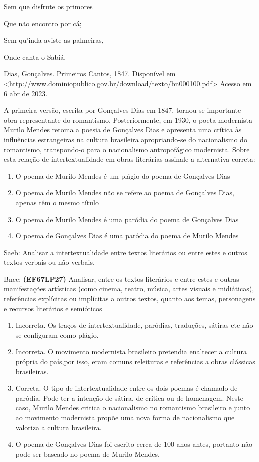 Sem que disfrute os primores

Que não encontro por cá;

Sem qu'inda aviste as palmeiras,

Onde canta o Sabiá.

Dias, Gonçalves. Primeiros Cantos, 1847. Disponível em
\textless{}\href{http://www.dominiopublico.gov.br/download/texto/bn000100.pdf}{\uline{http://www.dominiopublico.gov.br/download/texto/bn000100.pdf}}\textgreater{}
Acesso em 6 abr de 2023.

A primeira versão, escrita por Gonçalves Dias em 1847, tornou-se
importante obra representante do romantismo. Posteriormente, em 1930, o
poeta modernista Murilo Mendes retoma a poesia de Gonçalves Dias e
apresenta uma crítica às influências estrangeiras na cultura brasileira
apropriando-se do nacionalismo do romantismo, transpondo-o para o
nacionalismo antropofágico modernista. Sobre esta relação de
intertextualidade em obras literárias assinale a alternativa correta:

\begin{enumerate}
\def\labelenumi{\alph{enumi})}
\item
  O poema de Murilo Mendes é um plágio do poema de Gonçalves Dias
\item
  O poema de Murilo Mendes não se refere ao poema de Gonçalves Dias,
  apenas têm o mesmo título
\item
  O poema de Murilo Mendes é uma paródia do poema de Gonçalves Dias
\item
  O poema de Gonçalves Dias é uma paródia do poema de Murilo Mendes
\end{enumerate}

Saeb: Analisar a intertextualidade entre textos literários ou entre
estes e outros textos verbais ou não verbais.

Bncc: \textbf{(EF67LP27)} Analisar, entre os textos literários e entre
estes e outras manifestações artísticas (como cinema, teatro, música,
artes visuais e midiáticas), referências explícitas ou implícitas a
outros textos, quanto aos temas, personagens e recursos literários e
semióticos

\begin{enumerate}
\def\labelenumi{\arabic{enumi}.}
\item
  Incorreta. Os traços de intertextualidade, paródias, traduções,
  sátiras etc não se configuram como plágio.
\item
  Incorreta. O movimento modernista brasileiro pretendia enaltecer a
  cultura própria do país,por isso, eram comuns releituras e referências
  a obras clássicas brasileiras.
\item
  Correta. O tipo de intertextualidade entre os dois poemas é chamado de
  paródia. Pode ter a intenção de sátira, de crítica ou de homenagem.
  Neste caso, Murilo Mendes critica o nacionalismo no romantismo
  brasileiro e junto ao movimento modernista propõe uma nova forma de
  nacionalismo que valoriza a cultura brasileira.
\item
  O poema de Gonçalves Dias foi escrito cerca de 100 anos antes,
  portanto não pode ser baseado no poema de Murilo Mendes.
\end{enumerate}

